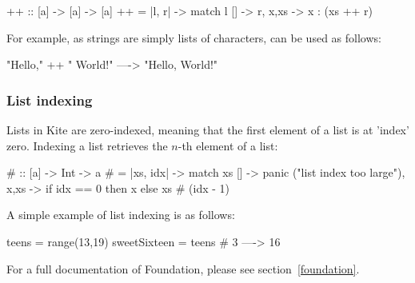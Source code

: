 \begin{kite}
{++} :: [a] -> [a] -> [a]
{++} = |l, r| -> {
  match l {
    [] -> r,
    x,xs -> x : (xs ++ r)
  }
}
\end{kite}

For example, as strings are simply lists of characters, \code{++} can be used as follows:

\begin{kite}
"Hello," ++ " World!" ----> "Hello, World!"
\end{kite}

\subsubsection{List indexing}
Lists in Kite are zero-indexed, meaning that the first element of a list is at 'index' zero. Indexing a list retrieves the $n$-th element of a list:

\begin{kite}
{#} :: [a] -> Int -> a
{#} = |xs, idx| -> {
  match xs {
    [] -> panic ("list index too large"),
    x,xs -> if idx == 0 then x else xs # (idx - 1)
  }
}
\end{kite}

A simple example of list indexing is as follows:

\begin{kite}
teens = range(13,19)
sweetSixteen = teens # 3 ----> 16
\end{kite}

For a full documentation of Foundation, please see section~\ref{foundation}.
